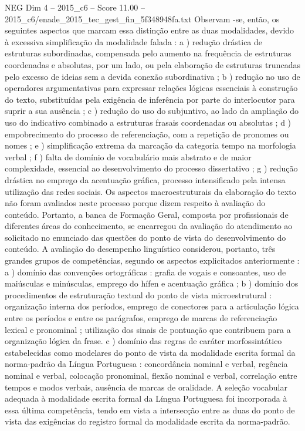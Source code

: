 \begin{textsample}{NEG Dim 4 – 2015\_c6 – Score 11.00 – 2015\_c6/enade\_2015\_tec\_gest\_fin\_5f348948fa.txt}
Observam -se, então, os seguintes aspectos que marcam essa distinção entre as duas modalidades, devido à excessiva simplificação da modalidade falada : a ) redução drástica de estruturas subordinadas, compensada pelo aumento na frequência de estruturas coordenadas e absolutas, por um lado, ou pela elaboração de estruturas truncadas pelo excesso de ideias sem a devida conexão subordinativa ; b ) redução no uso de operadores argumentativas para expressar relações lógicas essenciais à construção do texto, substituídas pela exigência de inferência por parte do interlocutor para suprir a sua ausência ; c ) redução do uso do subjuntivo, ao lado da ampliação do uso do indicativo combinado a estruturas frasais coordenadas ou absolutas ; d ) empobrecimento do processo de referenciação, com a repetição de pronomes ou nomes ; e ) simplificação extrema da marcação da categoria tempo na morfologia verbal ; f ) falta de domínio de vocabulário mais abstrato e de maior complexidade, essencial ao desenvolvimento do processo dissertativo ; g ) redução drástica no emprego da acentuação gráfica, processo intensificado pela intensa utilização das redes sociais.
Os aspectos macroestruturais da elaboração do texto não foram avaliados neste processo porque dizem respeito à avaliação do conteúdo.
Portanto, a banca de Formação Geral, composta por profissionais de diferentes áreas do conhecimento, se encarregou da avaliação do atendimento ao solicitado no enunciado das questões do ponto de vista do desenvolvimento do conteúdo.
A avaliação do desempenho linguístico considerou, portanto, três grandes grupos de competências, segundo os aspectos explicitados anteriormente : a ) domínio das convenções ortográficas : grafia de vogais e consoantes, uso de maiúsculas e minúsculas, emprego do hífen e acentuação gráfica ; b ) domínio dos procedimentos de estruturação textual do ponto de vista microestrutural : organização interna dos períodos, emprego de conectores para a articulação lógica entre os períodos e entre os parágrafos, emprego de marcas de referenciação lexical e pronominal ; utilização dos sinais de pontuação que contribuem para a organização lógica da frase. c ) domínio das regras de caráter morfossintático estabelecidas como modelares do ponto de vista da modalidade escrita formal da norma-padrão da Língua Portuguesa : concordância nominal e verbal, regência nominal e verbal, colocação pronominal, flexão nominal e verbal, correlação entre tempos e modos verbais, ausência de marcas de oralidade.
A seleção vocabular adequada à modalidade escrita formal da Língua Portuguesa foi incorporada à essa última competência, tendo em vista a intersecção entre as duas do ponto de vista das exigências do registro formal da modalidade escrita da norma-padrão.

\end{textsample}
